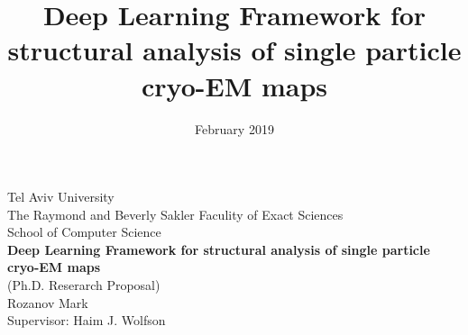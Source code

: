 \documentclass{article}
\title{Deep Learning Framework for structural analysis of  single particle cryo-EM maps}
\date{February 2019}
\begin{document}
\Large
\begin{center}Tel Aviv University \\
The Raymond and Beverly Sakler Faculity of Exact Sciences\\
School of Computer Science\\
\textbf{\large  Deep Learning Framework for structural analysis of  single particle cryo-EM maps} \\
(Ph.D. Reserarch Proposal) \\
Rozanov Mark \\
Supervisor: Haim J. Wolfson \\
\end{center}
\normalsize








{}

\end{document}
